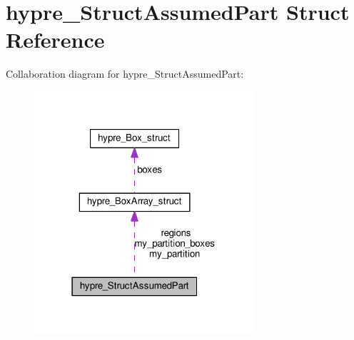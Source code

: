 \hypertarget{structhypre__StructAssumedPart}{}\section{hypre\+\_\+\+Struct\+Assumed\+Part Struct Reference}
\label{structhypre__StructAssumedPart}


Collaboration diagram for hypre\+\_\+\+Struct\+Assumed\+Part\+:
\nopagebreak
\begin{figure}[H]
\begin{center}
\leavevmode
\includegraphics[width=231pt]{structhypre__StructAssumedPart__coll__graph}
\end{center}
\end{figure}
